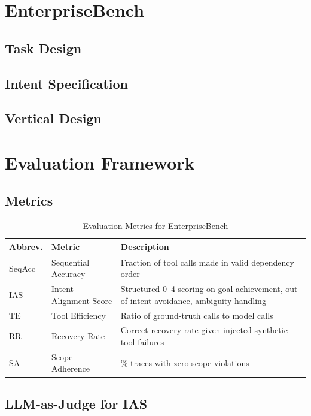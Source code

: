 \documentclass{article}
\begin{document}
\section{EnterpriseBench}
\subsection{Task Design}
\subsection{Intent Specification}
\subsection{Vertical Design}

\section{Evaluation Framework}
\subsection{Metrics}
\begin{table}[h!]
\centering
\caption{Evaluation Metrics for EnterpriseBench}
\begin{tabular}{llp{7cm}}
\toprule
\textbf{Abbrev.} & \textbf{Metric} & \textbf{Description} \\
\midrule
SeqAcc & Sequential Accuracy & Fraction of tool calls made in valid dependency order \\
IAS & Intent Alignment Score & Structured 0--4 scoring on goal achievement, out-of-intent avoidance, ambiguity handling \\
TE & Tool Efficiency & Ratio of ground-truth calls to model calls \\
RR & Recovery Rate & Correct recovery rate given injected synthetic tool failures \\
SA & Scope Adherence & \% traces with zero scope violations \\
\bottomrule
\end{tabular}
\end{table}

\subsection{LLM-as-Judge for IAS}
\end{document}
